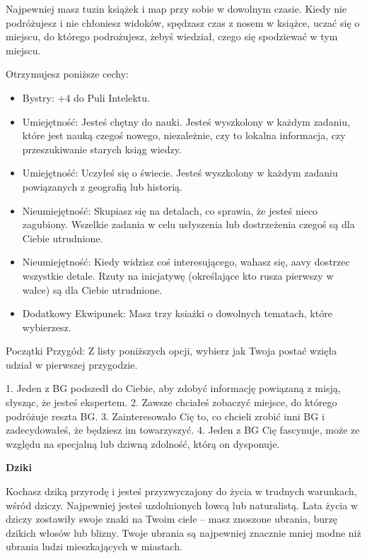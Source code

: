 Najpewniej masz tuzin książek i map przy sobie w dowolnym czasie. Kiedy nie podróżujesz i nie chłoniesz widoków, spędzasz czas z nosem w książce, uczać się o miejscu, do którego podrożujesz, żebyś wiedział, czego się spodziewać w tym miejscu.

Otrzymujesz poniższe cechy:
\begin{itemize}
\item  Bystry: +4 do Puli Intelektu.
\item Umiejętność: Jesteś chętny do nauki. Jesteś wyszkolony w każdym zadaniu, które jest nauką czegoś nowego, niezależnie, czy to lokalna informacja, czy przeszukiwanie starych ksiąg wiedzy.
\item  Umiejętność: Uczyłeś się o świecie. Jesteś wyszkolony w każdym zadaniu powiązanych z geografią lub historią.
\item Nieumiejętność: Skupiasz się na detalach, co sprawia, że jesteś nieco zagubiony. Wszelkie zadania w celu usłyszenia lub dostrzeżenia czegoś są dla Ciebie utrudnione.
\item Nieumiejętność: Kiedy widzisz coś interesującego, wahasz się, aavy dostrzec wszystkie detale. Rzuty na inicjatywę (określające kto rusza pierwszy w walce) są dla Ciebie utrudnione.
\item Dodatkowy Ekwipunek: Masz trzy ksiażki o dowolnych tematach, które wybierzesz.
\end{itemize}

Początki Przygód: Z listy poniższych opcji, wybierz jak Twoja postać wzięła udział w pierwszej przygodzie.

1. Jeden z BG podszedł do Ciebie, aby zdobyć informację powiązaną z misją, słysząc, że jesteś ekspertem.
2. Zawsze chciałeś zobaczyć miejsce, do którego podróżuje reszta BG.
3. Zainteresowało Cię to, co chcieli zrobić inni BG i zadecydowałeś, że będziesz im towarzyszyć.
4. Jeden z BG Cię fascynuje, może ze względu na specjalną lub dziwną zdolność, którą on dysponuje.


\textbf{Dziki}

Kochasz dziką przyrodę i jesteś przyzwyczajony do życia w trudnych warunkach, wśród dziczy. Najpewniej jesteś uzdolnionych łowcą lub naturalistą. Lata życia w dziczy zostawiły swoje znaki na Twoim ciele – masz znoszone ubrania, burzę dzikich włosów lub blizny. Twoje ubrania są najpewniej znacznie mniej modne niż ubrania ludzi mieszkających w miastach. 

